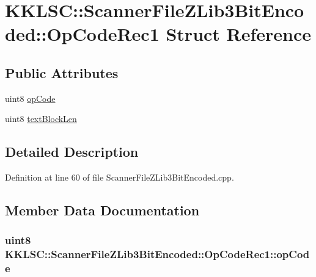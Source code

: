 \hypertarget{struct_scanner_file_z_lib3_bit_encoded_1_1_op_code_rec1}{}\section{K\+K\+L\+SC\+:\+:Scanner\+File\+Z\+Lib3\+Bit\+Encoded\+:\+:Op\+Code\+Rec1 Struct Reference}
\label{struct_scanner_file_z_lib3_bit_encoded_1_1_op_code_rec1}
\subsection*{Public Attributes}
\begin{DoxyCompactItemize}
\item 
uint8 \hyperlink{struct_scanner_file_z_lib3_bit_encoded_1_1_op_code_rec1_a30d9dd3e6669613575669f97d2458929}{op\+Code}
\item 
uint8 \hyperlink{struct_scanner_file_z_lib3_bit_encoded_1_1_op_code_rec1_a5aaf6daf0ee2641077d11ea31e395785}{text\+Block\+Len}
\end{DoxyCompactItemize}


\subsection{Detailed Description}


Definition at line 60 of file Scanner\+File\+Z\+Lib3\+Bit\+Encoded.\+cpp.



\subsection{Member Data Documentation}
\subsubsection[{\texorpdfstring{op\+Code}{opCode}}]{\setlength{\rightskip}{0pt plus 5cm}uint8 K\+K\+L\+S\+C\+::\+Scanner\+File\+Z\+Lib3\+Bit\+Encoded\+::\+Op\+Code\+Rec1\+::op\+Code}\hypertarget{struct_scanner_file_z_lib3_bit_encoded_1_1_op_code_rec1_a30d9dd3e6669613575669f97d2458929}{}\label{struct_scanner_file_z_lib3_bit_encoded_1_1_op_code_rec1_a30d9dd3e6669613575669f97d2458929}



